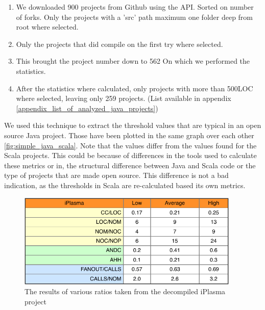 \documentclass[onecolumn]{article}
\begin{document}
\begin{enumerate}
    \item We downloaded 900 projects from Github using the API. Sorted on number of forks. Only the projects with a 'src' path maximum one folder deep from root where selected.
    \item Only the projects that did compile on the first try where selected.
    \item This brought the project number down to 562 On which we performed the statistics.
    \item After the statistics where calculated, only projects with more than 500LOC where selected, leaving only 259 projects. (List available in appendix \ref{appendix_list_of_analyzed_java_projects})
\end{enumerate}

We used this technique to extract the threshold values that are typical in an open source Java project. Those have been plotted in the same graph over each other \ref{fig:simple_java_scala}. Note that the values differ from the values found for the Scala projects. This could be because of differences in the tools used to calculate these metrics or in, the structural difference between Java and Scala code or the type of projects that are made open source. This difference is not a bad indication, as the thresholds in Scala are re-calculated based its own metrics.
\begin{figure}[H]
    \centering
    \includegraphics[width=300pt]{fig/statistics-iPlasma.pdf}
    \caption{The results of various ratios taken from the decompiled iPlasma project}
    \label{fig:statistics-iPlasma}
\end{figure}
\end{document}
